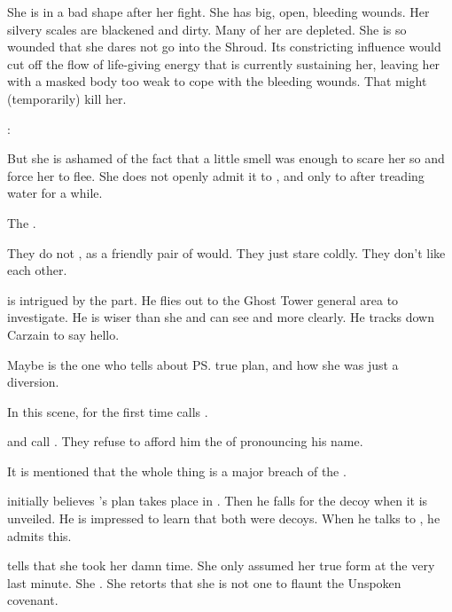 She is in a bad shape after her fight. 
She has big, open, bleeding wounds. 
Her silvery scales are blackened and dirty. 
Many of her  are depleted. 
She is so wounded that she dares not go into the Shroud. 
Its constricting influence would cut off the flow of life-giving \xsic{} energy that is currently sustaining her, leaving her with a masked body too weak to cope with the bleeding wounds. 
That might (temporarily) kill her. 

\Nzessuacrith: 

But she is ashamed of the fact that a little \sathariah{} smell was enough to scare her so and force her to flee. 
She does not openly admit it to \Ishnaruchaefir, and only to \Secherdamon{} after treading water for a while. 

The \dragons {}. 

They do not , as a friendly pair of \dragons{} would. 
They just stare coldly. 
They don't like each other. 

\Ishnaruchaefir{} is intrigued by the \sathariah{} part. 
He flies out to the Ghost Tower general area to investigate. 
He is wiser than she and can see \matrices{} and \vertices{} more clearly. 
He tracks down Carzain to say hello. 

Maybe \Ishnaruchaefir{} is the one who tells \Nzessuacrith{} about \ps{\Secherdamon} true plan, and how she was just a diversion. 

In this scene, \Nzessuacrith{} for the first time calls \Ishnaruchaefir{} . 

\Nzessuacrith{} and \Secherdamon{} call \Ishnaruchaefir{} . 
They refuse to afford him the \honour of pronouncing his name. 

It is mentioned that the whole thing is a major breach of the \charade. 

\Ishnaruchaefir initially believes \Secherdamon's plan takes place in \Malcur.
Then he falls for the \Forclin decoy when it is unveiled. 
He is impressed to learn that both were decoys. 
When he talks to \Nzessuacrith, he admits this. 

\Secherdamon tells \Nzessuacrith that she took her damn time.
She only assumed her true form at the very last minute. 
She .
She retorts that she is not one to flaunt the Unspoken covenant. 





